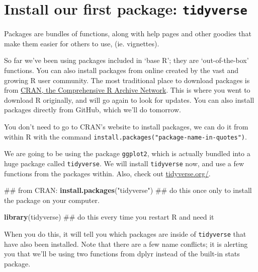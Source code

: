 \documentclass[]{book}
\newenvironment{Shaded}{\begin{snugshade}}{\end{snugshade}}
\newcommand{\KeywordTok}[1]{\textcolor[rgb]{0.13,0.29,0.53}{\textbf{#1}}}
\newcommand{\StringTok}[1]{\textcolor[rgb]{0.31,0.60,0.02}{#1}}
\newcommand{\NormalTok}[1]{#1}
\theoremstyle{definition}
\theoremstyle{definition}
\theoremstyle{definition}
\theoremstyle{remark}
\begin{document}
\section{\texorpdfstring{Install our first package:
\texttt{tidyverse}}{Install our first package: tidyverse}}\label{install-our-first-package-tidyverse}

Packages are bundles of functions, along with help pages and other
goodies that make them easier for others to use, (ie. vignettes).

So far we've been using packages included in `base R'; they are
`out-of-the-box' functions. You can also install packages from online
created by the vast and growing R user community. The most traditional
place to download packages is from
\href{https://cran.r-project.org/}{CRAN, the Comprehensive R Archive
Network}. This is where you went to download R originally, and will go
again to look for updates. You can also install packages directly from
GitHub, which we'll do tomorrow.

You don't need to go to CRAN's website to install packages, we can do it
from within R with the command
\texttt{install.packages("package-name-in-quotes")}.

We are going to be using the package \texttt{ggplot2}, which is actually
bundled into a huge package called \texttt{tidyverse}. We will install
\texttt{tidyverse} now, and use a few functions from the packages
within. Also, check out
\href{https://www.tidyverse.org}{tidyverse.org/}.

\begin{Shaded}
\begin{Highlighting}[]
\NormalTok{## from CRAN:}
\KeywordTok{install.packages}\NormalTok{(}\StringTok{"tidyverse"}\NormalTok{) ## do this once only to install the package on your computer.}
\end{Highlighting}
\end{Shaded}

\begin{Shaded}
\begin{Highlighting}[]
\KeywordTok{library}\NormalTok{(tidyverse) ## do this every time you restart R and need it }
\end{Highlighting}
\end{Shaded}

When you do this, it will tell you which packages are inside of
\texttt{tidyverse} that have also been installed. Note that there are a
few name conflicts; it is alerting you that we'll be using two functions
from dplyr instead of the built-in stats package.
\end{document}
